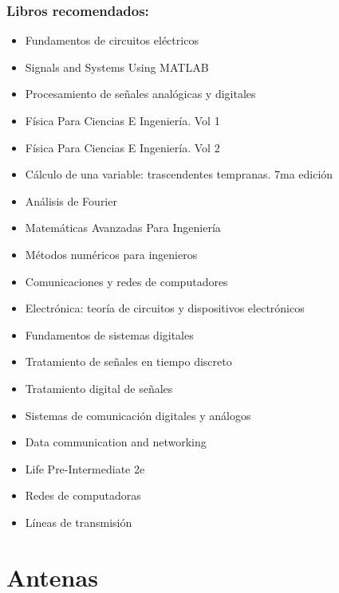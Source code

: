 \documentclass[
	12pt, %
	fleqn, %
	a4paper, %
	oneside, %
]{LegrandOrangeBook}
\begin{document}
\section*{Libros recomendados:}
\begin{itemize}
\item Fundamentos de circuitos eléctricos\cite{alexander2013fundamentos}
\item Signals and Systems Using MATLAB\cite{chaparro2018signals}
\item Procesamiento de señales analógicas y digitales\cite{ambardar1995analog}
\item Física Para Ciencias E Ingeniería. Vol 1\cite{serway2018fisica1}
\item Física Para Ciencias E Ingeniería. Vol 2\cite{serway2018fisica2}
\item Cálculo de una variable: trascendentes tempranas. 7ma edición \cite{stewart12calculo}
\item Análisis de Fourier\cite{hsu1998analisis}
\item Matemáticas Avanzadas Para Ingeniería\cite{o2014matematicas}
\item Métodos numéricos para ingenieros\cite{chapra2013metodos}
\item Comunicaciones y redes de computadores\cite{stallings2004comunicaciones}
\item Electrónica: teoría de circuitos y dispositivos electrónicos\cite{boylestad1989electronica}
\item Fundamentos de sistemas digitales\cite{floyd2006fundamentos}
\item Tratamiento de señales en tiempo discreto\cite{oppenheim2011tratamiento}
\item Tratamiento digital de señales\cite{proakis2007tratamiento}
\item Sistemas de comunicación digitales y análogos\cite{couchsistemas}
\item Data communication and networking\cite{forouzan2007data}
\item Life Pre-Intermediate 2e\cite{hughes2017life}
\item Redes de computadoras\cite{tanenbaum2012computer}
\item Líneas de transmisión\cite{velalineas1999}
\end{itemize}
\part{Antenas}
\end{document}

